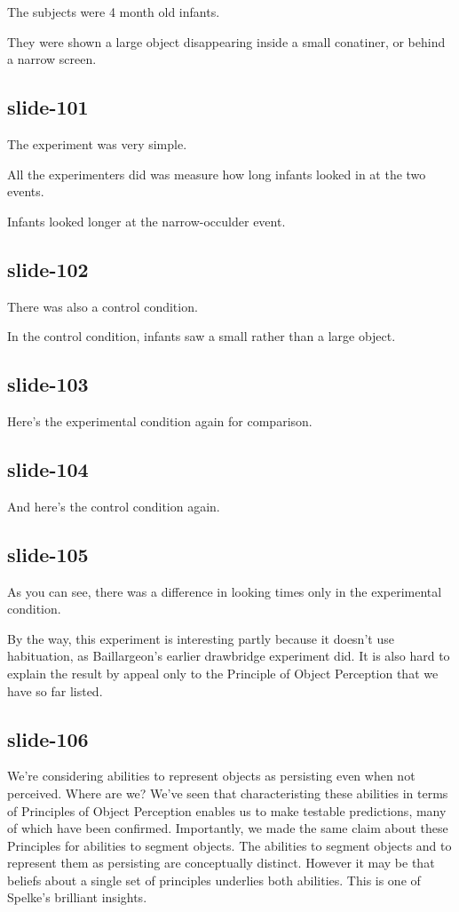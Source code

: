 \documentclass[12pt,\papersize]{extarticle}
\begin{document}
The subjects were 4 month old infants.
 
They were shown a large object disappearing inside a small conatiner, or behind a narrow screen.
 
\subsection{slide-101}
The experiment was very simple.
 
All the experimenters did was measure how long infants looked in at the two events.
 
Infants looked longer at the narrow-occulder event.
 
\subsection{slide-102}
There was also a control condition.
 
In the control condition, infants saw a small rather than a large object.
 
\subsection{slide-103}
Here’s the experimental condition again for comparison.
 
\subsection{slide-104}
And here's the control condition again.
 
\subsection{slide-105}
As you can see, there was a difference in looking times only in the experimental condition.
 
By the way, this experiment is interesting partly because it doesn't use habituation, as 
Baillargeon's earlier drawbridge experiment did.
It is also hard to explain the result by appeal only to the Principle of Object Perception
that we have so far listed.
 
\subsection{slide-106}
We're considering abilities to represent objects as persisting even when not perceived. 
Where are we?
We've seen that characteristing these abilities in terms of Principles of Object Perception
enables us to make testable predictions, many of which have been confirmed.
Importantly, we made the same claim about these Principles for abilities to segment objects.
The abilities to segment objects and to represent them as persisting are conceptually 
distinct.
However it may be that beliefs about a single set of principles underlies both abilities.
This is one of Spelke's brilliant insights.
 
\end{document}
